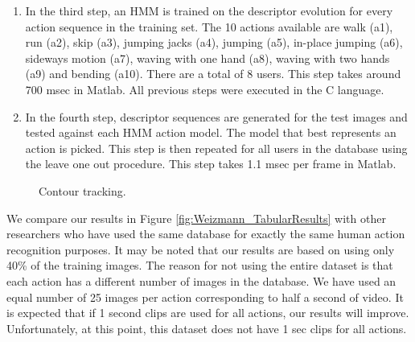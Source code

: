 \documentclass[12pt,letterpaper,doublespaced,ETD,proposal]{gt-ece-thesis}
\begin{document}
\begin{Body}
\begin{enumerate}
\item In the third step, an HMM is trained on the descriptor evolution for every action sequence in the training set.  The 10 actions available are walk (a1), run (a2), skip (a3), jumping jacks (a4), jumping (a5), in-place jumping (a6), sideways motion (a7), waving with one hand (a8), waving with two hands (a9) and bending (a10).  There are a total of 8 users.  This step takes around 700 msec in Matlab.  All previous steps were executed in the C language.

\item In the fourth step, descriptor sequences are generated for the test images and tested against each HMM action model.  The model that best represents an action is picked.  This step is then repeated for all users in the database using the leave one out procedure.  This step takes 1.1 msec per frame in Matlab.   
\end{enumerate}

			\begin{figure}[t]
						\centering
			
						\caption{Contour tracking.} 	
						\label{fig:Contours}	
			\end{figure}

We compare our results in Figure \ref{fig:Weizmann_TabularResults} with other researchers who have used the same database for exactly the same human action recognition purposes.  It may be noted that our results are based on using only 40\% of the training images.  The reason for not using the entire dataset is that each action has a different number of images in the database.  We have used an equal number of 25 images per action corresponding to half a second of video.  It is expected that if 1 second clips are used for all actions, our results will improve.  Unfortunately, at this point, this dataset does not have 1 sec clips for all actions.  



\end{Body}
\end{document}

